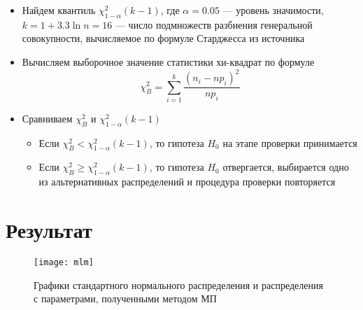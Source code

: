 \documentclass[12pt]{article}
\begin{document}
\begin{itemize}
    \item Найдем квантиль $\chi^2_{1 - \alpha}(k - 1)$, где $\alpha = 0.05$ –– уровень значимости, $k = 1 + 3.3 \ln n = 16$ –– число подмножеств разбиения генеральной совокупности, вычисляемое по формуле Старджесса из источника \cite{ms_1}
    \item Вычисляем выборочное значение статистики хи-квадрат по формуле
    \begin{equation}
        \chi^2_B = \sum_{i=1}^{k}\frac{(n_i - np_i)^2}{np_i}
        \label{eq_7:11}
    \end{equation}
    \item Сравниваем $\chi^2_B$ и $\chi^2_{1 - \alpha}(k - 1)$
    \begin{itemize}
        \item Если $\chi^2_B < \chi^2_{1 - \alpha}(k - 1)$, то гипотеза $H_0$ на этапе проверки принимается
        \item Если $\chi^2_B \ge \chi^2_{1 - \alpha}(k - 1)$, то гипотеза $H_0$ отвергается, выбирается одно из альтернативных распределений и процедура проверки повторяется
    \end{itemize}
\end{itemize}


\newpage
\section*{Результат}

\begin{figure}[h!]
\centering
\texttt{[image: mlm]}
\label{pic_7:1}
\caption{Графики стандартного нормального распределения и распределения с параметрами, полученными методом МП}
\end{figure}

\newpage
\end{document}
